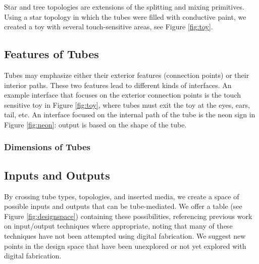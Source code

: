 Star and tree topologies are extensions of the splitting and mixing primitives.  Using a star topology in which the tubes were filled with conductive paint, we created a toy with several touch-sensitive areas, see Figure \ref{fig:toy}. 

\subsection{Features of Tubes}

Tubes may emphasize either their exterior features (connection points) or their interior paths.  These two features lead to different kinds of interfaces.  An example interface that focuses on the exterior connection points is the touch sensitive toy in Figure \ref{fig:toy}, where tubes must exit the toy at the eyes, ears, tail, etc.  An interface focused on the internal path of the tube is the neon sign in Figure \ref{fig:neon}: output is based on the shape of the tube. 

\subsubsection{Dimensions of Tubes}


\subsection{Inputs and Outputs}

 

By crossing tube types, topologies, and inserted media, we create a space of possible inputs and outputs that can be tube-mediated.  We offer a table (see Figure \ref{fig:designspace}) containing these possibilities, referencing previous work on input/output techniques where appropriate, noting that many of these techniques have not been attempted using digital fabrication.  We suggest new points in the design space that have been unexplored or not yet explored with digital fabrication.

